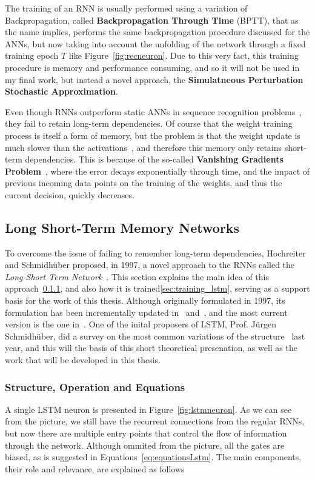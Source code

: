 The training of an RNN is usually performed using a variation of Backpropagation, called \textbf{Backpropagation Through Time} (BPTT), that as the name implies, performs the same backpropagation procedure discussed for the ANNs, but now taking into account the unfolding of the network through a fixed training epoch $T$ like Figure~\ref{fig:recneuron}. Due to this very fact, this training procedure is memory and performance consuming, and so it will not be used in my final work, but instead a novel approach, the \textbf{Simulatneous Perturbation Stochastic Approximation}. 

Even though RNNs outperform static ANNs in sequence recognition problems~\cite{Bengio1991}, they fail to retain long-term dependencies. Of course that the weight training process is itself a form of memory, but the problem is that the weight update is much slower than the activations~\cite{Yoshua01}, and therefore this memory only retains short-term dependencies. This is because of the so-called \textbf{Vanishing Gradients Problem}~\cite{Yoshua94,Yoshua01}, where the error decays exponentially through time, and the impact of previous incoming data points on the training of the weights, and thus the current decision, quickly decreases. 


\subsection{Long Short-Term Memory Networks}\label{sec:theorBack_lstm}
To overcome the issue of failing to remember long-term dependencies, Hochreiter and Schmidhüber proposed, in 1997, a novel approach to the RNNs called the \textit{Long-Short Term Network}~\cite{Hoch97}. This section explains the main idea of this approach~\ref{sec:struct_lstm}, and also how it is trained\ref{sec:training_lstm}, serving as a support basis for the work of this thesis.
Although originally formulated in 1997, its formulation has been incrementally updated in~\cite{Gers00} and~\cite{Gers2000}, and the most current version is the one in~\cite{Graves05}. One of the inital proposers of LSTM, Prof. Jürgen Schmidhüber, did a survey on the most common variations of the structure~\cite{Greff15} last year, and this will the basis of this short theoretical presenation, as well as the work that will be developed in this thesis. 

\subsubsection{Structure, Operation and Equations}\label{sec:struct_lstm}
A single LSTM neuron is presented in Figure~\ref{fig:lstmneuron}. As we can see from the picture, we still have the recurrent connections from the regular RNNs, but now there are multiple entry points that control the flow of information through the network. Although ommited from the  picture, all the gates are biased, as is suggested in Equations~\ref{eq:equationsLstm}. The main components, their role and relevance, are explained as follows

